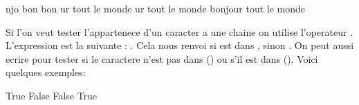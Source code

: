 \documentclass[letterpaper,10pt,french]{sphinxmanual}
\begin{document}
\begin{sphinxVerbatim}[commandchars=\\\{\}]
njo
bon
bon
ur tout le monde
ur tout le monde
bonjour tout le monde
\end{sphinxVerbatim}

\sphinxAtStartPar
Si l’on veut tester l’appartenece d’un caracter a une chaine on utilise l’operateur . L’expression est la suivante : . Cela nous renvoi  si est dans , sinon . On peut aussi ecrire  pour tester si le caractere n’est pas dans  () ou s’il est dans  (). Voici quelques exemples:

\begin{sphinxVerbatim}[commandchars=\\\{\}]
  

  

  

   

   
\end{sphinxVerbatim}

\begin{sphinxVerbatim}[commandchars=\\\{\}]
True
False
False
True
\end{sphinxVerbatim}
\end{document}
